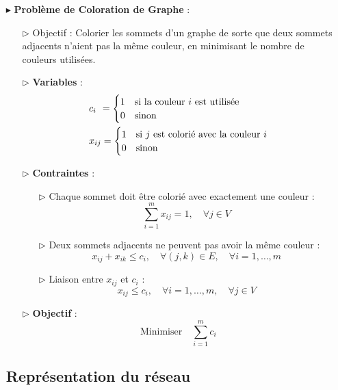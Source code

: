 \documentclass{report}
\begin{document}
\begin{multicols*}{2}
\begin{itemize}
    \item[$\blacktriangleright$] \textbf{Problème de Coloration de Graphe} :
    \begin{itemize}
        \item[$\rhd$] Objectif : Colorier les sommets d'un graphe de sorte que deux sommets adjacents n'aient pas la même couleur, en minimisant le nombre de couleurs utilisées.
\setlength{\itemindent}{0pt}
        \item[$\rhd$] \textbf{Variables} :
        \begin{align*}
            & c_{i\phantom{j}} =
            \begin{cases}
            1 & \text{si la couleur \( i \) est utilisée} \\
            0 & \text{sinon}
            \end{cases} \\
            & x_{ij} =
            \begin{cases}
            1 & \text{si  \( j \) est colorié avec la couleur \( i \)} \\
            0 & \text{sinon}
            \end{cases}
        \end{align*}
\setlength{\itemindent}{\labelsep}
        \item[$\rhd$] \textbf{Contraintes} :
        \begin{itemize}
            \item[$\rhd$] Chaque sommet doit être colorié avec exactement une couleur :
            \[
            \sum_{i=1}^{m} x_{ij} = 1, \quad \forall j \in V
            \]
            \item[$\rhd$] Deux sommets adjacents ne peuvent pas avoir la même couleur :
            \[
            x_{ij} + x_{ik} \leq c_i, \quad \forall (j,k) \in E, \quad \forall i = 1,\dots,m
            \]
            \item[$\rhd$] Liaison entre \( x_{ij} \) et \( c_i \) :
            \[
            x_{ij} \leq c_i, \quad \forall i = 1,\dots,m, \quad \forall j \in V
            \]
        \end{itemize}
        \item[$\rhd$] \textbf{Objectif} :
        \[
        \text{Minimiser} \quad \sum_{i=1}^{m} c_i
        \]
    \end{itemize}

\subsection{Représentation du réseau}


\end{itemize}
\end{multicols*}
\end{document}
